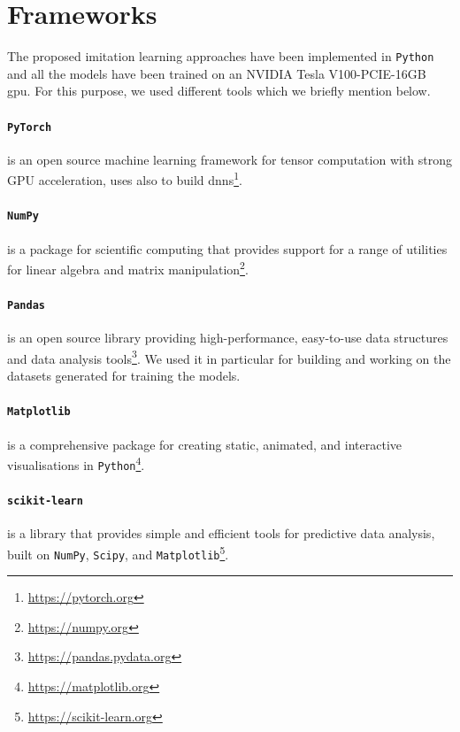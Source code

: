 \section{Frameworks}
\label{sec:learning}
The proposed imitation learning approaches have been implemented in 
\texttt{Python} and all the models have been trained on an NVIDIA Tesla 
V100-PCIE-16GB \gls{gpu}.
For this purpose, we used different tools which we briefly mention below.

\paragraph*{\texttt{PyTorch}} is an open source machine learning framework  for 
tensor computation with strong GPU acceleration, uses also to build 
\glspl{dnn}\footnote{\url{https://pytorch.org}}.

\paragraph*{\texttt{NumPy}} is a package for scientific computing that provides 
support for a range of utilities for linear algebra and matrix 
manipulation\footnote{\url{https://numpy.org}}.

\paragraph*{\texttt{Pandas}} is an open source library providing 
high-performance, easy-to-use data structures and data analysis 
tools\footnote{\url{https://pandas.pydata.org}}. We used it in particular for 
building 
and working on the datasets generated for training the models. 

\paragraph*{\texttt{Matplotlib}} is a comprehensive package for creating 
static, animated, and interactive visualisations in 
\texttt{Python}\footnote{\url{https://matplotlib.org}}. 

\paragraph*{\texttt{scikit-learn}} is a library that provides simple and efficient 
tools for predictive data analysis, built on \texttt{NumPy}, \texttt{Scipy}, and 
\texttt{Matplotlib}\footnote{\url{https://scikit-learn.org}}.



